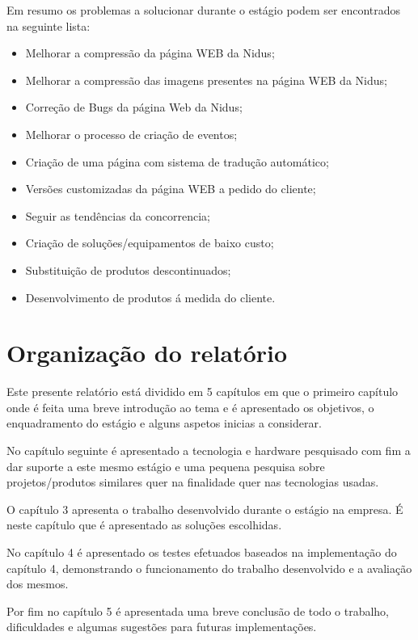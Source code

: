 \par
Em resumo os problemas a solucionar durante o estágio podem ser encontrados na seguinte lista:
\begin{itemize}
\item Melhorar a compressão da página WEB da Nidus;
\item Melhorar a compressão das imagens presentes na página WEB da Nidus;
\item Correção de Bugs da página Web da Nidus;
\item Melhorar o processo de criação de eventos;
\item Criação de uma página com sistema de tradução automático;
\item Versões customizadas da página WEB a pedido do cliente;
\item Seguir as tendências da concorrencia;
\item Criação de soluções/equipamentos de baixo custo;
\item Substituição de produtos descontinuados;
\item Desenvolvimento  de produtos á medida do cliente.
\end{itemize}

\section{Organização do relatório}

\par Este presente relatório está dividido em 5 capítulos em que o primeiro capítulo onde é feita uma breve introdução ao tema e é apresentado os objetivos, o enquadramento do estágio e alguns aspetos inicias a considerar. 
\par No capítulo seguinte é apresentado a tecnologia e hardware pesquisado com fim a dar suporte a este mesmo estágio e uma pequena pesquisa sobre projetos/produtos similares quer na finalidade quer nas tecnologias usadas. 
\par O capítulo 3 apresenta o trabalho desenvolvido durante o estágio na empresa. É neste capítulo que é apresentado as soluções escolhidas. 
\par No capítulo 4 é  apresentado os testes efetuados baseados na implementação do capítulo 4, demonstrando o funcionamento do trabalho desenvolvido e a avaliação dos mesmos. 
\par Por fim no capítulo 5 é apresentada uma breve conclusão de todo o trabalho, dificuldades e algumas sugestões para futuras implementações. 


